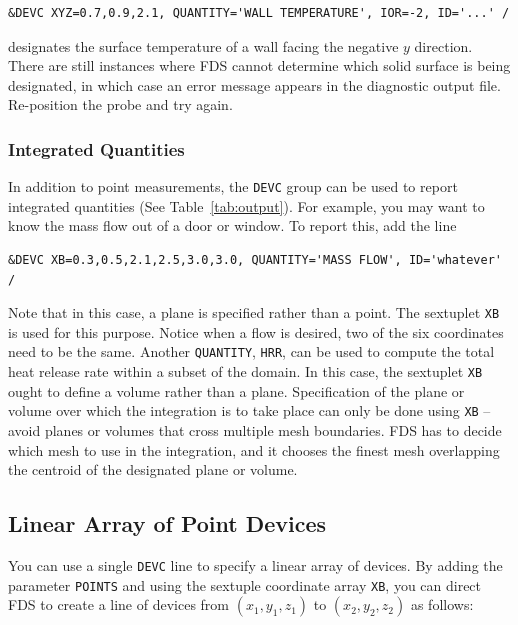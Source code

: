 \documentclass[11pt]{book}
\newcommand{\ct}{\tt\small}
\begin{document}
\footnotesize
\begin{verbatim}
&DEVC XYZ=0.7,0.9,2.1, QUANTITY='WALL TEMPERATURE', IOR=-2, ID='...' /
\end{verbatim}
\normalsize

\noindent
designates the surface temperature of a wall facing the negative $y$
direction. There are still instances where FDS cannot
determine which solid surface is being designated, in which case an
error message appears in the diagnostic output file.
Re-position the probe and try again.

\subsubsection{Integrated Quantities}

In addition to point measurements, the {\ct DEVC} group can be used
to report integrated quantities (See Table~\ref{tab:output}).
For example, you may want to know the mass flow out of a door or window.
To report this, add the line

\footnotesize
\begin{verbatim}
&DEVC XB=0.3,0.5,2.1,2.5,3.0,3.0, QUANTITY='MASS FLOW', ID='whatever' /
\end{verbatim}
\normalsize

\noindent
Note that in this case, a plane is specified rather than
a point. The sextuplet {\ct XB} is used for this purpose. Notice when a
flow is desired, two of the six coordinates need to be the same. Another
{\ct QUANTITY}, {\ct HRR}, can be used to compute the total heat release
rate within a subset of the domain. In this case, the sextuplet
{\ct XB} ought to define a volume rather than a plane. Specification of
the plane or volume over which the integration is to take place can only
be done using {\ct XB} -- avoid planes or volumes
that cross multiple mesh boundaries. FDS has to decide which mesh to
use in the integration, and it chooses the finest mesh overlapping
the centroid of the designated plane or volume.



\subsection{Linear Array of Point Devices}
\label{info:line_file}

You can use a single {\ct DEVC} line to specify a linear array of devices. By adding the parameter {\ct POINTS} and using the
sextuple coordinate array {\ct XB}, you can direct FDS to create a line of devices from $(x_1,y_1,z_1)$ to $(x_2,y_2,z_2)$ as follows:
\end{document}
